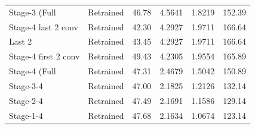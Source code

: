 \begin{table}
\begin{tabular}{llcccc}
Stage-3 (Full & Retrained & 46.78 & 4.5641 & 1.8219 & 152.39 \\
Stage-4 last 2 conv & Retrained & 42.30 & 4.2927 & 1.9711 & 166.64 \\
Last 2 & Retrained & 43.45 & 4.2927 & 1.9711 & 166.64 \\
Stage-4 first 2 conv & Retrained & 49.43 & 4.2305 & 1.9554 & 165.89 \\
Stage-4 (Full & Retrained & 47.31 & 2.4679 & 1.5042 & 150.89 \\
Stage-3-4 & Retrained & 47.00 & 2.1825 & 1.2126 & 132.14 \\
Stage-2-4 & Retrained & 47.49 & 2.1691 & 1.1586 & 129.14 \\
Stage-1-4 & Retrained & 47.68 & 2.1634 & 1.0674 & 123.14 \\
\bottomrule
\end{tabular}
\end{table}
